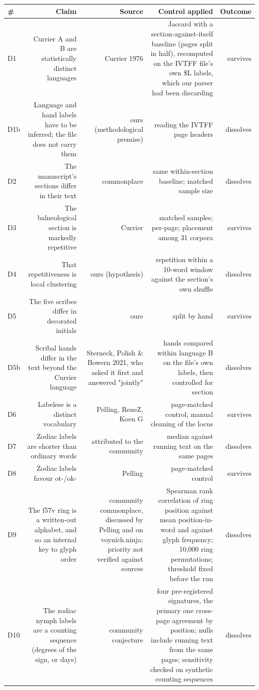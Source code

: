 \documentclass[11pt,a4paper]{article}
\begin{document}
\begin{table}[htbp]\centering\small
\begin{tabular}{@{}lrrrr@{}}
\toprule
\# & Claim & Source & Control applied & Outcome \\
\midrule
D1 & Currier A and B are statistically distinct languages & Currier 1976 & Jaccard with a section-against-itself baseline (pages split in half), recomputed on the IVTFF file's own \$L labels, which our parser had been discarding & survives \\
D1b & Language and hand labels have to be inferred; the file does not carry them & ours (methodological premise) & reading the IVTFF page headers & dissolves \\
D2 & The manuscript's sections differ in their text & commonplace & same within-section baseline; matched sample size & dissolves \\
D3 & The balneological section is markedly repetitive & Currier & matched samples; per-page; placement among 31 corpora & survives \\
D4 & That repetitiveness is local clustering & ours (hypothesis) & repetition within a 10-word window against the section's own shuffle & dissolves \\
D5 & The five scribes differ in decorated initials & ours & split by hand & survives \\
D5b & Scribal hands differ in the text beyond the Currier language & Sterneck, Polish \& Bowern 2021, who asked it first and answered "jointly" & hands compared within language B on the file's own labels, then controlled for section & dissolves \\
D6 & Labelese is a distinct vocabulary & Pelling, ReneZ, Koen G & page-matched control; manual cleaning of the locus & survives \\
D7 & Zodiac labels are shorter than ordinary words & attributed to the community & median against running text on the same pages & dissolves \\
D8 & Zodiac labels favour ot-/ok- & Pelling & page-matched control & survives \\
D9 & The f57v ring is a written-out alphabet, and so an internal key to glyph order & community commonplace, discussed by Pelling and on voynich.ninja; priority not verified against sources & Spearman rank correlation of ring position against mean position-in-word and against glyph frequency; 10,000 ring permutations; threshold fixed before the run & dissolves \\
D10 & The zodiac nymph labels are a counting sequence (degrees of the sign, or days) & community conjecture & four pre-registered signatures, the primary one cross-page agreement by position; nulls include running text from the same pages; sensitivity checked on synthetic counting sequences & dissolves \\

\end{tabular}
\end{table}
\end{document}
